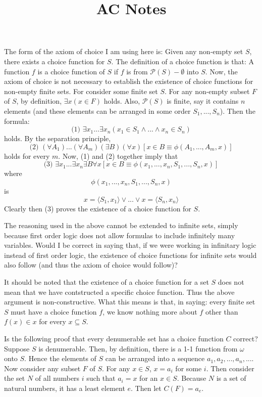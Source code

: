 \documentclass{article}
\title{AC Notes}
\theoremstyle{definition}
\begin{document}
\date{}
\maketitle

The form of the axiom of choice I am using here is: Given any non-empty set $S$, there exists a choice function for $S$. The definition of a choice 
function is that: A function $f$ is a choice function of $S$ if $f$ is from $\mathcal{P}(S)-\emptyset$ into $S$. Now, the axiom of choice is not necessary 
to establish the existence of choice functions for non-empty finite sets. For consider some finite set $S$. For any non-empty subset 
$F$ of $S$, by definition, $\exists x(x\in F)$ holds. Also, $\mathcal{P}(S)$ is finite, say it contains $n$ elements (and these elements 
can be arranged in some order $S_1,...,S_n$). Then the formula:
\[ \textrm{(1) }\exists x_1...\exists x_n(x_1\in S_1\wedge ...\wedge x_n\in S_n) \] holds. By the separation principle,
\[ \textrm{(2) }(\forall A_1)...(\forall A_m)(\exists B)(\forall x)[x\in B\equiv\phi(A_1,...,A_m,x)] \] holds for every $m$.  
Now, (1) and (2) together imply that 
\[ \textrm{(3) }\exists x_1...\exists x_n\exists B\forall x[x\in B\equiv \phi(x_1,...,x_n,S_1,...,S_n,x)] \]
where
\[ \phi(x_1,...,x_n,S_1,...,S_n,x) \] is
\[ x=\langle S_1,x_1\rangle\vee ...\vee x=\langle S_n,x_n\rangle \]
Clearly then (3) proves the existence of a choice function for $S$.

The reasoning used in the above cannot be extended to infinite sets, simply because first order logic does not allow formulas to include 
infinitely many variables. Would I be correct in saying that, if we were working in infinitary logic instead of first order logic, the 
existence of choice functions for infinite sets would also follow (and thus the axiom of choice would follow)?

It should be noted that the existence of a choice function for a set $S$ does not mean that we have contstructed a specific choice 
function. Thus the above argument is non-constructive. What this means is that, in saying: every finite set $S$ must have a choice function $f$,
we know nothing more about $f$ other than $f(x)\in x$ for every $x\subseteq S$.

Is the following proof that every denumerable set has a choice function $C$ correct? Suppose $S$ is denumerable. Then, by definition, there is a 
1-1 function from $\omega$ onto $S$. Hence the elements of $S$ can be arranged into a sequence $a_1,a_2,...,a_n,...$. Now consider any subset $F$ 
of $S$. For any $x\in S$, $x=a_i$ for some $i$. Then consider the set $N$ of all numbers $i$ such that $a_i=x$ for 
an $x\in S$. Because $N$ is a set of natural numbers, it has a least element $e$. Then let $C(F)=a_e$.
\end{document}
